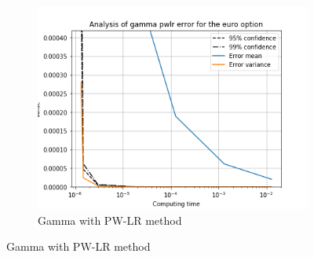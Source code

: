 \documentclass[11pt,a4paper,fleqn]{article}
\begin{document}
\begin{figure}[h!]
\begin{subfigure}[b]{0.3\textwidth}
          \includegraphics[width=\textwidth]{graphs/eurogammapwlrtime.png}
          \caption{Gamma with PW-LR method}
      \end{subfigure}


\end{figure}
\end{document}
